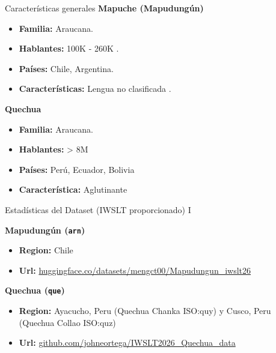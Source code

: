 \documentclass[11pt]{beamer}
\begin{document}
\begin{frame}{Características generales}
\textbf{Mapuche (Mapudungún)}
\begin{itemize}
    \item \textbf{Familia:} Araucana.
    \item \textbf{Hablantes:} 100K - 260K \cite{zuniga2006mapudungun}.
    \item \textbf{Países:} Chile, Argentina.
    \item  \textbf{Características:} Lengua no clasificada \cite{zuniga2006mapudungun}.
\end{itemize}

\pause

\textbf{Quechua}
\begin{itemize}
    \item \textbf{Familia:} Araucana.
    \item \textbf{Hablantes:} > 8M
    \item \textbf{Países:} Perú, Ecuador,  Bolivia
    \item \textbf{Característica:} Aglutinante
\end{itemize}
\end{frame}

\begin{frame}{Estadísticas del Dataset (IWSLT proporcionado) I}

	\textbf{Mapudungún (\texttt{arn})} \cite{duan2020resourcecomputationalexperimentsmapudungun}
	\begin{itemize}
		\item \textbf{Region:} Chile
		\item \textbf{Url:} \url{huggingface.co/datasets/mengct00/Mapudungun_iwslt26}
	\end{itemize} \pause

	\textbf{Quechua (\texttt{que})} \cite{cardenas2018siminchik}
	\begin{itemize}
		\item \textbf{Region:} Ayacucho, Peru (Quechua Chanka ISO:quy) y Cusco, Peru (Quechua Collao ISO:quz)
	\item \textbf{Url:} \url{github.com/johneortega/IWSLT2026_Quechua_data}
	\end{itemize}

\end{frame}
\end{document}
